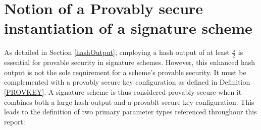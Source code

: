 \documentclass[]{final_report}
\theoremstyle{definition}
\begin{document}

\section{Notion of a Provably secure instantiation of a signature scheme}
\label{sec:ProvablySecureInstantiation}


As detailed in Section \ref{hashOutput}, employing a hash output of at least \(\frac{\lambda}{2}\) is essential for provable security in signature schemes. However, this enhanced hash output is not the sole requirement for a scheme's provable security. It must be complemented with a provably secure key configuration as defined in Definition \ref{PROVKEY}. A signature scheme is thus considered provably secure when it combines both a large hash output and a provablt secure key configuration. This leads to the definition of two primary parameter types referenced throughour this report:
\end{document}
